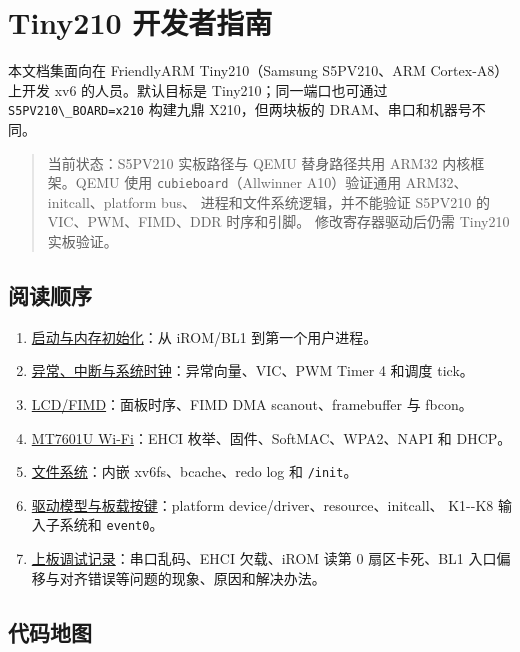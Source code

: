 \chapter{Tiny210
开发者指南}\label{tiny210-ux5f00ux53d1ux8005ux6307ux5357}

本文档集面向在 FriendlyARM Tiny210（Samsung S5PV210、ARM
Cortex-A8）上开发 xv6 的人员。默认目标是 Tiny210；同一端口也可通过
\passthrough{\lstinline!S5PV210\_BOARD=x210!} 构建九鼎 X210，但两块板的
DRAM、串口和机器号不同。

\begin{quote}
当前状态：S5PV210 实板路径与 QEMU 替身路径共用 ARM32 内核框架。QEMU 使用
\passthrough{\lstinline!cubieboard!}（Allwinner A10）验证通用
ARM32、initcall、platform bus、 进程和文件系统逻辑，并不能验证 S5PV210
的 VIC、PWM、FIMD、DDR 时序和引脚。 修改寄存器驱动后仍需 Tiny210
实板验证。
\end{quote}

\section{阅读顺序}\label{ux9605ux8bfbux987aux5e8f}

\begin{enumerate}
\def\labelenumi{\arabic{enumi}.}
\tightlist
\item
  \href{boot.md}{启动与内存初始化}：从 iROM/BL1 到第一个用户进程。
\item
  \href{interrupts.md}{异常、中断与系统时钟}：异常向量、VIC、PWM Timer 4
  和调度 tick。
\item
  \href{lcd.md}{LCD/FIMD}：面板时序、FIMD DMA scanout、framebuffer 与
  fbcon。
\item
  \href{wifi.md}{MT7601U Wi-Fi}：EHCI 枚举、固件、SoftMAC、WPA2、NAPI 和
  DHCP。
\item
  \href{filesystem.md}{文件系统}：内嵌 xv6fs、bcache、redo log 和
  \passthrough{\lstinline!/init!}。
\item
  \href{drivers.md}{驱动模型与板载按键}：platform
  device/driver、resource、initcall、 K1-\/-K8 输入子系统和
  \passthrough{\lstinline!event0!}。
\item
  \href{bringup-notes.md}{上板调试记录}：串口乱码、EHCI 欠载、iROM 读第
  0 扇区卡死、BL1 入口偏移与对齐错误等问题的现象、原因和解决办法。
\end{enumerate}

\section{代码地图}\label{ux4ee3ux7801ux5730ux56fe}


